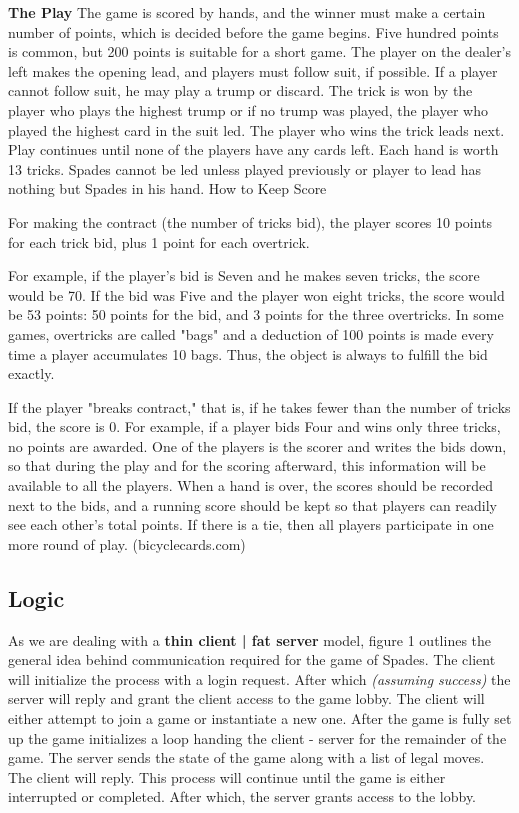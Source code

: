 \textbf
{
  The Play
}\newline
The game is scored by hands, and the winner must make a certain number of points, which is decided before the game begins. Five hundred points is common, but 200 points is suitable for a short game. The player on the dealer's left makes the opening lead, and players must follow suit, if possible. If a player cannot follow suit, he may play a trump or discard. The trick is won by the player who plays the highest trump or if no trump was played, the player who played the highest card in the suit led. The player who wins the trick leads next. Play continues until none of the players have any cards left. Each hand is worth 13 tricks. Spades cannot be led unless played previously or player to lead has nothing but Spades in his hand.
How to Keep Score

For making the contract (the number of tricks bid), the player scores 10 points for each trick bid, plus 1 point for each overtrick.

For example, if the player's bid is Seven and he makes seven tricks, the score would be 70. If the bid was Five and the player won eight tricks, the score would be 53 points: 50 points for the bid, and 3 points for the three overtricks. In some games, overtricks are called "bags" and a deduction of 100 points is made every time a player accumulates 10 bags. Thus, the object is always to fulfill the bid exactly.

If the player "breaks contract," that is, if he takes fewer than the number of tricks bid, the score is 0. For example, if a player bids Four and wins only three tricks, no points are awarded.
One of the players is the scorer and writes the bids down, so that during the play and for the scoring afterward, this information will be available to all the players. When a hand is over, the scores should be recorded next to the bids, and a running score should be kept so that players can readily see each other's total points. If there is a tie, then all players participate in one more round of play. (bicyclecards.com)

\subsection
{
  Logic
}

As we are dealing with a \textbf
{
  thin client | fat server
} model, figure 1 outlines the general idea behind communication required for the game of Spades. The client will initialize the process with a login request. After which \textit
{
  (assuming success)
} the server will reply and grant the client access to the game lobby. The client will either attempt to join a game or instantiate a new one. After the game is fully set up the game initializes a loop handing the client - server for the remainder of the game. The server sends the state of the game along with a list of legal moves. The client will reply. This process will continue until the game is either interrupted or completed. After which, the server grants access to the lobby.  	

